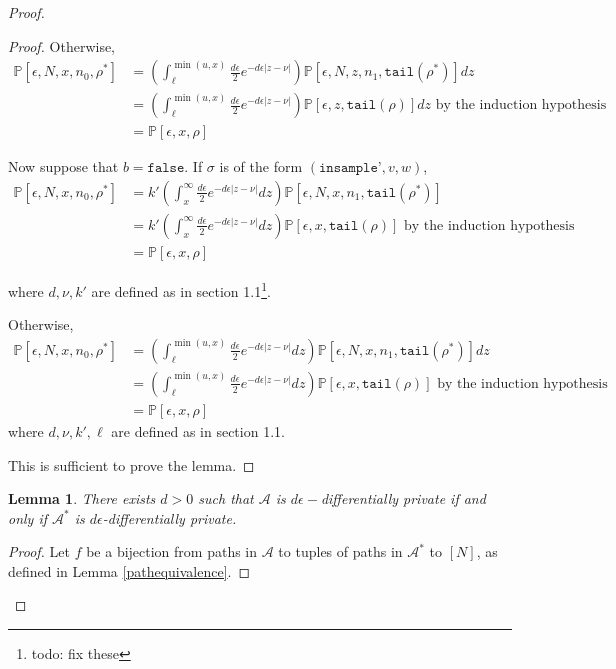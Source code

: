\documentclass[12pt]{article}
\newcommand{\PP}{\mathbb{P}}
\newtheorem{lemma}[thm]{Lemma}
\theoremstyle{definition}
\begin{document}
\begin{proof}
\begin{proof}
	Otherwise, 
	\begin{align*}
		\PP[\epsilon, N, x, n_0, \rho^*] &= \left(\int_{\ell}^{\min(u, x)}\frac{d\epsilon}{2}e^{-d\epsilon|z-\nu|}\right)\PP[\epsilon, N, z, n_1, \texttt{tail}(\rho^*)]dz \\
		&= \left(\int_{\ell}^{\min(u, x)}\frac{d\epsilon}{2}e^{-d\epsilon|z-\nu|}\right)\PP[\epsilon, z, \texttt{tail}(\rho)]dz \text{ by the induction hypothesis }\\
		&= \PP[\epsilon, x, \rho]
	\end{align*}

	Now suppose that $b = \texttt{false}$. If $\sigma$ is of the form $(\texttt{insample'}, v, w)$, 
	\begin{align*}
		\PP[\epsilon, N, x, n_0, \rho^*] &= k'\left(\int_x^\infty\frac{d\epsilon}{2}e^{-d\epsilon|z-\nu|}dz\right)\PP[\epsilon, N, x, n_1, \texttt{tail}(\rho^*)]\\
		&= k'\left(\int_x^\infty\frac{d\epsilon}{2}e^{-d\epsilon|z-\nu|}dz\right)\PP[\epsilon, x, \texttt{tail}(\rho)] \text{ by the induction hypothesis }\\
		&= \PP[\epsilon, x, \rho]
	\end{align*}

	where $d, \nu, k'$ are defined as in section 1.1\footnote{todo: fix these}.

	Otherwise, 
	\begin{align*}
		\PP[\epsilon, N, x, n_0, \rho^*] &= \left(\int_{\ell}^{\min(u, x)}\frac{d\epsilon}{2}e^{-d\epsilon|z-\nu|}dz\right)\PP[\epsilon, N, x, n_1, \texttt{tail}(\rho^*)]dz \\
		&= \left(\int_{\ell}^{\min(u, x)}\frac{d\epsilon}{2}e^{-d\epsilon|z-\nu|}dz\right)\PP[\epsilon, x, \texttt{tail}(\rho)] \text{ by the induction hypothesis }\\
		&= \PP[\epsilon, x, \rho]
	\end{align*}
	where $d, \nu, k', \ell$ are defined as in section 1.1.

	This is sufficient to prove the lemma. 
	
\end{proof}

\begin{lemma}\label{dpequiv}
	There exists $d > 0$ such that $\mathcal{A}$ is $d\epsilon-$differentially private if and only if $\mathcal{A}^*$ is $d\epsilon$-differentially private.
\end{lemma}

\begin{proof}
	Let $f$ be a bijection from paths in $\mathcal{A}$ to tuples of paths in $\mathcal{A}^*$ to $[N]$, as defined in Lemma \ref{pathequivalence}.


\end{proof}
\end{proof}
\end{document}
